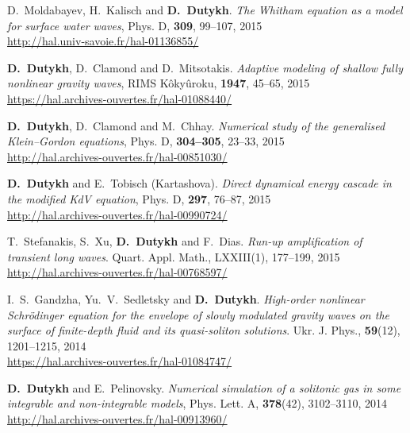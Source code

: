 \documentclass[final, a4paper, oneside, 12pt]{article}
\numberwithin{equation}{section}
\begin{document}
\begin{etaremune}
  \item D.~Moldabayev, H.~Kalisch and \textbf{D.~Dutykh}. \textit{The Whitham equation as a model for surface water waves}, Phys. D, \textbf{309}, 99--107, 2015 \\ %
  \url{http://hal.univ-savoie.fr/hal-01136855/}
  
  \item \textbf{D.~Dutykh}, D.~Clamond and D.~Mitsotakis. \textit{Adaptive modeling of shallow fully nonlinear gravity waves}, RIMS K\^oky\^uroku, \textbf{1947}, 45--65, 2015 \\ %
  \url{https://hal.archives-ouvertes.fr/hal-01088440/}
  
  \item \textbf{D.~Dutykh}, D.~Clamond and M.~Chhay. \textit{Numerical study of the generalised Klein--Gordon equations}, Phys. D, \textbf{304--305}, 23--33, 2015 \\ %
  \url{http://hal.archives-ouvertes.fr/hal-00851030/}
  
  \item \textbf{D.~Dutykh} and E.~Tobisch (Kartashova). \textit{Direct dynamical energy cascade in the modified KdV equation}, Phys. D, \textbf{297}, 76--87, 2015 \\ %
  \url{http://hal.archives-ouvertes.fr/hal-00990724/}

  \item T.~Stefanakis, S.~Xu, \textbf{D.~Dutykh} and F.~Dias. \textit{Run-up amplification of transient long waves}. Quart. Appl. Math., LXXIII(1), 177--199, 2015 \\ %
  \url{http://hal.archives-ouvertes.fr/hal-00768597/}


  \item I.~S.~Gandzha, Yu.~V.~Sedletsky and \textbf{D.~Dutykh}. \textit{High-order nonlinear Schr\"odinger equation for the envelope of slowly modulated gravity waves on the surface of finite-depth fluid and its quasi-soliton solutions}. Ukr. J. Phys., \textbf{59}(12), 1201--1215, 2014 \\ %
  \url{https://hal.archives-ouvertes.fr/hal-01084747/}
  
  \item \textbf{D.~Dutykh} and E.~Pelinovsky. \textit{Numerical simulation of a solitonic gas in some integrable and non-integrable models}, Phys. Lett. A, \textbf{378}(42), 3102--3110, 2014 \\ %
  \url{http://hal.archives-ouvertes.fr/hal-00913960/}
  

\end{etaremune}
\end{document}
